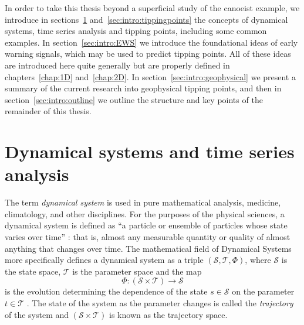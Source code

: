In order to take this thesis beyond a superficial study of the canoeist example, we introduce in sections~\ref{sec:intro:dynamicalsystems} and~\ref{sec:intro:tippingpoints} the concepts of dynamical systems, time series analysis and tipping points, including some common examples. In section~\ref{sec:intro:EWS} we introduce the foundational ideas of early warning signals, which may be used to predict tipping points. All of these ideas are introduced here quite generally but are properly defined in chapters~\ref{chap:1D} and~\ref{chap:2D}. In section~\ref{sec:intro:geophysical} we present a summary of the current research into geophysical tipping points, and then in section~\ref{sec:intro:outline} we outline the structure and key points of the remainder of this thesis.

\section{Dynamical systems and time series analysis}
\label{sec:intro:dynamicalsystems}


The term \emph{dynamical system} is used in pure mathematical analysis, medicine, climatology, and other disciplines. For the purposes of the physical sciences, a dynamical system is defined as ``a particle or ensemble of particles whose state varies over time'' \citep{natureDynamicalsystems}: that is, almost any measurable quantity or quality of almost anything that changes over time. The mathematical field of Dynamical Systems more specifically defines a dynamical system as a triple $(\mathcal{S},\mathcal{T},\Phi)$, where $\mathcal{S}$ is the state space, $\mathcal{T}$ is the parameter space and the map
	\begin{equation}
		\label{eqn:intro:dynamicalsystem_triplemap}
		\Phi : (\mathcal{S}\times\mathcal{T}) \rightarrow \mathcal{S}
	\end{equation}
is the evolution determining the dependence of the state $s\in\mathcal{S}$ on the parameter $t\in\mathcal{T}$ \citep{brown2018introduction}. The state of the system as the parameter changes is called the \emph{trajectory} of the system and $(\mathcal{S}\times\mathcal{T})$ is known as the trajectory space. 

